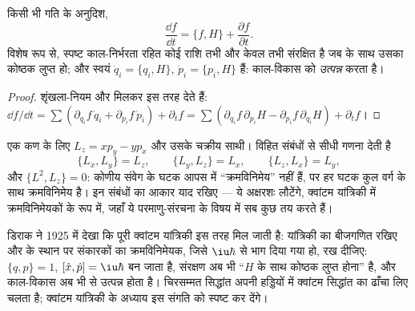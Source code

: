 \begin{theorem}[विकास एक कोष्ठक के रूप में]\label{thm:b3:hamiltonian-mechanics:evolution}
किसी भी गति के अनुदिश,
\[
\frac{\dd f}{\dd t} = \{f, H\} + \frac{\partial f}{\partial t} .
\]
विशेष रूप से, स्पष्ट काल-निर्भरता रहित कोई राशि तभी और केवल तभी
संरक्षित है जब  के साथ उसका कोष्ठक लुप्त हो; और
स्वयं  $\dot q_i = \{q_i, H\}$, $\dot p_i
= \{p_i, H\}$ हैं:  काल-विकास को \emph{उत्पन्न} करता है।
\end{theorem}

\begin{proof}
शृंखला-नियम और  मिलकर इस तरह देते हैं: $\dd f/\dd t = \sum(
\partial_{q_i}f\,\dot q_i + \partial_{p_i}f\,\dot p_i) + \partial_tf =
\sum(\partial_{q_i}f\,\partial_{p_i}H - \partial_{p_i}f\,
\partial_{q_i}H) + \partial_tf$।
\end{proof}

\begin{example}[कोणीय संवेग के कोष्ठक]\label{ex:b3:hamiltonian-mechanics:brackets}
एक कण के लिए $L_z = xp_y - yp_x$ और उसके चक्रीय साथी। विहित संबंधों से
सीधी गणना देती है
\[
\{L_x, L_y\} = L_z , \qquad
\{L_y, L_z\} = L_x , \qquad
\{L_z, L_x\} = L_y ,
\]
और $\{L^2, L_z\} = 0$: कोणीय संवेग के घटक आपस में
``क्रमविनिमेय'' नहीं हैं, पर हर घटक कुल वर्ग के साथ क्रमविनिमेय है।
इन संबंधों का आकार याद रखिए --- ये अक्षरशः लौटेंगे, क्वांटम यांत्रिकी
में क्रमविनिमेयकों के रूप में, जहाँ ये परमाणु-संरचना के विषय में सब कुछ
तय करते हैं।
\end{example}

\begin{remark}[क्वांटम यांत्रिकी का द्वार]\label{rem:b3:hamiltonian-mechanics:doorway}
डिराक ने 1925 में देखा कि पूरी क्वांटम यांत्रिकी इस तरह मिल जाती है:
 यांत्रिकी का बीजगणित रखिए और
 के स्थान पर संकारकों का क्रमविनिमेयक, जिसे
$\iu\hbar$ से भाग दिया गया हो, रख दीजिए: $\{q, p\} = 1$, $[\hat x, \hat p] = \iu\hbar$ बन जाता है,
संरक्षण अब भी ``$H$ के साथ कोष्ठक लुप्त होना'' है, और काल-विकास
अब भी  से उत्पन्न होता है। चिरसम्मत सिद्धांत
अपनी हड्डियों में क्वांटम सिद्धांत का ढाँचा लिए चलता है; क्वांटम
यांत्रिकी के अध्याय इस संगति को स्पष्ट कर देंगे।
\end{remark}

